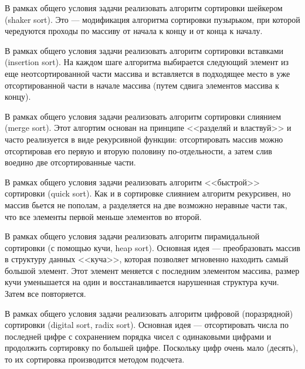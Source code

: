 \begin{zztask}
В рамках общего условия задачи реализовать алгоритм 
сортировки шейкером (shaker sort). Это --- модификация алгоритма сортировки пузырьком,
при которой чередуются проходы по массиву от начала к концу и от конца к началу.
\end{zztask}

\begin{zztask}
В рамках общего условия задачи реализовать алгоритм 
сортировки вставками (insertion sort). На каждом шаге алгоритма выбирается следующий 
элемент из еще неотсортированной части массива и вставляется в подходящее место в уже 
отсортированной части в начале массива (путем сдвига элементов массива к концу).
\end{zztask}

\begin{zztask}
В рамках общего условия задачи реализовать алгоритм 
сортировки слиянием (merge sort). Этот алгортим основан на принципе
<<разделяй и властвуй>> и часто реализуется в виде рекурсивной функции:
отсортировать массив можно отсортировав его первую и вторую половину 
по-отдельности, а затем слив воедино две отсортированные части.
\end{zztask}

\begin{zztask}
В рамках общего условия задачи реализовать алгоритм 
<<быстрой>> сортировки (quick sort). Как и в сортировке слиянием алгоритм
рекурсивен, но массив бьется не пополам, а разделяется на две возможно 
неравные части так, что все элементы первой меньше элементов во второй.
\end{zztask}

\begin{zztask}
В рамках общего условия задачи реализовать алгоритм 
пирамидальной сортировки (с помощью кучи, heap sort). Основная идея ---
преобразовать массив в структуру данных <<куча>>, которая позволяет мгновенно 
находить самый большой элемент. Этот элемент меняется с последним элементом 
массива, размер кучи уменьшается на один и восстанавливается нарушенная 
структура кучи. Затем все повторяется.
\end{zztask}

\begin{zztask}
В рамках общего условия задачи реализовать алгоритм 
цифровой (поразрядной) сортировки (digital sort, radix sort). Основная идея ---
отсортировать числа по последней цифре с сохранением порядка чисел с одинаковыми 
цифрами и продолжить сортировку по большей цифре. Поскольку цифр очень мало (десять), 
то их сортировка производится методом подсчета.
\end{zztask}
